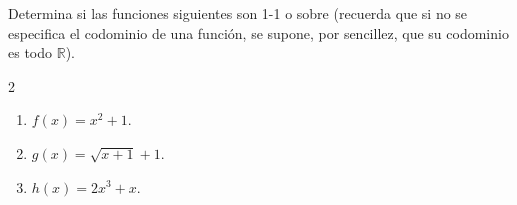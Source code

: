 \documentclass[12pt,a4paper]{article}
\begin{document}
    \begin{problema}
        Determina si las funciones siguientes son 1-1 o sobre (recuerda que
        si no se especifica el codominio de una función, se supone, por sencillez,
        que su codominio es todo $\mathbb{R}$).
        \begin{multicols}{2}
            \begin{enumerate}
                \item[(a)] $f\left(x\right)=x^{2}+1.$
                \item[(b)] $g\left(x\right)=\sqrt{x+1}+1.$
                \item[(c)] $h\left(x\right)=2x^{3}+x.$ 
            \end{enumerate}
        \end{multicols}
    \end{problema}
\end{document}
